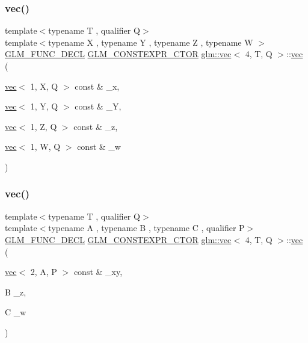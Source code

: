 \subsubsection{\texorpdfstring{vec()}{vec()}\hspace{0.1cm}{\footnotesize\ttfamily [7/34]}}
{\footnotesize\ttfamily template$<$typename T , qualifier Q$>$ \\
template$<$typename X , typename Y , typename Z , typename W $>$ \\
\hyperlink{setup_8hpp_ab2d052de21a70539923e9bcbf6e83a51}{G\+L\+M\+\_\+\+F\+U\+N\+C\+\_\+\+D\+E\+CL} \hyperlink{setup_8hpp_ad34178a09666081abdb573c14d1f4a5a}{G\+L\+M\+\_\+\+C\+O\+N\+S\+T\+E\+X\+P\+R\+\_\+\+C\+T\+OR} \hyperlink{structglm_1_1vec}{glm\+::vec}$<$ 4, T, Q $>$\+::\hyperlink{structglm_1_1vec}{vec} (\begin{DoxyParamCaption}\item[{\hyperlink{structglm_1_1vec}{vec}$<$ 1, X, Q $>$ const \&}]{\+\_\+x,  }\item[{\hyperlink{structglm_1_1vec}{vec}$<$ 1, Y, Q $>$ const \&}]{\+\_\+Y,  }\item[{\hyperlink{structglm_1_1vec}{vec}$<$ 1, Z, Q $>$ const \&}]{\+\_\+z,  }\item[{\hyperlink{structglm_1_1vec}{vec}$<$ 1, W, Q $>$ const \&}]{\+\_\+w }\end{DoxyParamCaption})}

\mbox{\label{structglm_1_1vec_3_014_00_01_t_00_01_q_01_4_a973c9293d62029453e5e2619061f84e8}} 
\subsubsection{\texorpdfstring{vec()}{vec()}\hspace{0.1cm}{\footnotesize\ttfamily [8/34]}}
{\footnotesize\ttfamily template$<$typename T , qualifier Q$>$ \\
template$<$typename A , typename B , typename C , qualifier P$>$ \\
\hyperlink{setup_8hpp_ab2d052de21a70539923e9bcbf6e83a51}{G\+L\+M\+\_\+\+F\+U\+N\+C\+\_\+\+D\+E\+CL} \hyperlink{setup_8hpp_ad34178a09666081abdb573c14d1f4a5a}{G\+L\+M\+\_\+\+C\+O\+N\+S\+T\+E\+X\+P\+R\+\_\+\+C\+T\+OR} \hyperlink{structglm_1_1vec}{glm\+::vec}$<$ 4, T, Q $>$\+::\hyperlink{structglm_1_1vec}{vec} (\begin{DoxyParamCaption}\item[{\hyperlink{structglm_1_1vec}{vec}$<$ 2, A, P $>$ const \&}]{\+\_\+xy,  }\item[{B}]{\+\_\+z,  }\item[{C}]{\+\_\+w }\end{DoxyParamCaption})}



